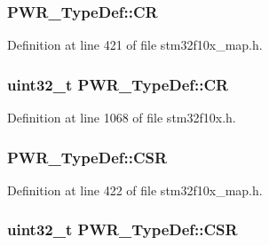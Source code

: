 \subsubsection[{\texorpdfstring{CR}{CR}}]{ P\+W\+R\+\_\+\+Type\+Def\+::\+CR}\hypertarget{struct_p_w_r___type_def_ad09495e9bf996ab2806d86d673287416}{}\label{struct_p_w_r___type_def_ad09495e9bf996ab2806d86d673287416}


Definition at line 421 of file stm32f10x\+\_\+map.\+h.

\subsubsection[{\texorpdfstring{CR}{CR}}]{ {\bf uint32\+\_\+t} P\+W\+R\+\_\+\+Type\+Def\+::\+CR}\hypertarget{struct_p_w_r___type_def_aeb6bcdb2b99d58b9a0ffd86deb606eac}{}\label{struct_p_w_r___type_def_aeb6bcdb2b99d58b9a0ffd86deb606eac}


Definition at line 1068 of file stm32f10x.\+h.

\subsubsection[{\texorpdfstring{C\+SR}{CSR}}]{ P\+W\+R\+\_\+\+Type\+Def\+::\+C\+SR}\hypertarget{struct_p_w_r___type_def_aebb269a260388fc3cc4a7b7c8ec6bba6}{}\label{struct_p_w_r___type_def_aebb269a260388fc3cc4a7b7c8ec6bba6}


Definition at line 422 of file stm32f10x\+\_\+map.\+h.

\subsubsection[{\texorpdfstring{C\+SR}{CSR}}]{ {\bf uint32\+\_\+t} P\+W\+R\+\_\+\+Type\+Def\+::\+C\+SR}\hypertarget{struct_p_w_r___type_def_ae17097e69c88b6c00033d6fb84a8182b}{}\label{struct_p_w_r___type_def_ae17097e69c88b6c00033d6fb84a8182b}


